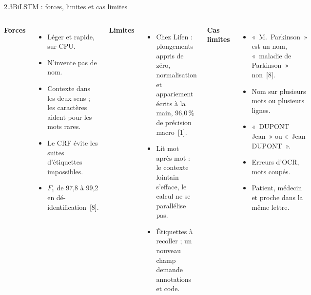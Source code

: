 \documentclass[11pt,aspectratio=169]{beamer}
\newcommand{\refs}[1]{{\color{mlblue}[#1]}}
\newcommand{\pct}[1]{#1\,\%}
\begin{document}
\begin{frame}{2.3\quad BiLSTM : forces, limites et cas limites}
  \begin{columns}[T]
    \textbf{Forces}
    {\small
    \begin{itemize}
      \item Léger et rapide, sur CPU.
      \item N'invente pas de nom.
      \item Contexte dans les deux sens ; les caractères aident pour les mots rares.
      \item Le CRF évite les suites d'étiquettes impossibles.
      \item $F_1$ de 97,8 à 99,2 en dé-identification~\refs{8}.
    \end{itemize}}
    \textbf{Limites}
    {\small
    \begin{itemize}
      \item Chez Lifen : plongements appris de zéro, normalisation et appariement écrits à la
        main, \pct{96,0} de précision macro~\refs{1}.
      \item Lit mot après mot : le contexte lointain s'efface, le calcul ne se parallélise
        pas.
      \item Étiquettes à recoller ; un nouveau champ demande annotations et code.
    \end{itemize}}
    \textbf{Cas limites}
    {\small
    \begin{itemize}
      \item «~M.~Parkinson~» est un nom, «~maladie de Parkinson~» non~\refs{8}.
      \item Nom sur plusieurs mots ou plusieurs lignes.
      \item «~DUPONT Jean~» ou «~Jean DUPONT~».
      \item Erreurs d'OCR, mots coupés.
      \item Patient, médecin et proche dans la même lettre.
    \end{itemize}}
  \end{columns}
\end{frame}
\end{document}
